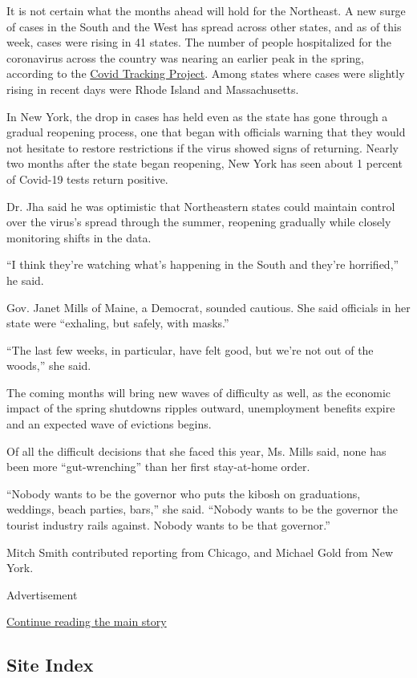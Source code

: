 It is not certain what the months ahead will hold for the Northeast. A
new surge of cases in the South and the West has spread across other
states, and as of this week, cases were rising in 41 states. The number
of people hospitalized for the coronavirus across the country was
nearing an earlier peak in the spring, according to the
\href{https://covidtracking.com/data/us-daily}{Covid Tracking Project}.
Among states where cases were slightly rising in recent days were Rhode
Island and Massachusetts.

In New York, the drop in cases has held even as the state has gone
through a gradual reopening process, one that began with officials
warning that they would not hesitate to restore restrictions if the
virus showed signs of returning. Nearly two months after the state began
reopening, New York has seen about 1 percent of Covid-19 tests return
positive.

Dr. Jha said he was optimistic that Northeastern states could maintain
control over the virus's spread through the summer, reopening gradually
while closely monitoring shifts in the data.

``I think they're watching what's happening in the South and they're
horrified,'' he said.

Gov. Janet Mills of Maine, a Democrat, sounded cautious. She said
officials in her state were ``exhaling, but safely, with masks.''

``The last few weeks, in particular, have felt good, but we're not out
of the woods,'' she said.

The coming months will bring new waves of difficulty as well, as the
economic impact of the spring shutdowns ripples outward, unemployment
benefits expire and an expected wave of evictions begins.

Of all the difficult decisions that she faced this year, Ms. Mills said,
none has been more ``gut-wrenching'' than her first stay-at-home order.

``Nobody wants to be the governor who puts the kibosh on graduations,
weddings, beach parties, bars,'' she said. ``Nobody wants to be the
governor the tourist industry rails against. Nobody wants to be that
governor.''

Mitch Smith contributed reporting from Chicago, and Michael Gold from
New York.

Advertisement

\protect\hyperlink{after-bottom}{Continue reading the main story}

\hypertarget{site-index}{%
\subsection{Site Index}\label{site-index}}

